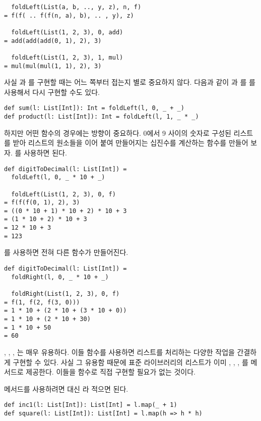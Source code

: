 \begin{verbatim}
  foldLeft(List(a, b, .., y, z), n, f)
= f(f( .. f(f(n, a), b), .. , y), z)

  foldLeft(List(1, 2, 3), 0, add)
= add(add(add(0, 1), 2), 3)

  foldLeft(List(1, 2, 3), 1, mul)
= mul(mul(mul(1, 1), 2), 3)
\end{verbatim}

사실 과 를 구현할 때는 어느 쪽부터 접는지 별로 중요하지
않다. 다음과 같이 과 를 를 사용해서 다시
구현할 수도 있다.

\begin{verbatim}
def sum(l: List[Int]): Int = foldLeft(l, 0, _ + _)
def product(l: List[Int]): Int = foldLeft(l, 1, _ * _)
\end{verbatim}

하지만 어떤 함수의 경우에는 방향이 중요하다. 0에서 9 사이의 숫자로 구성된
리스트를 받아 리스트의 원소들을 이어 붙여 만들어지는 십진수를 계산하는 함수를
만들어 보자. 를 사용하면 된다.

\begin{verbatim}
def digitToDecimal(l: List[Int]) =
  foldLeft(l, 0, _ * 10 + _)

  foldLeft(List(1, 2, 3), 0, f)
= f(f(f(0, 1), 2), 3)
= ((0 * 10 + 1) * 10 + 2) * 10 + 3
= (1 * 10 + 2) * 10 + 3
= 12 * 10 + 3
= 123
\end{verbatim}

를 사용하면 전혀 다른 함수가 만들어진다.

\begin{verbatim}
def digitToDecimal(l: List[Int]) =
  foldRight(l, 0, _ * 10 + _)

  foldRight(List(1, 2, 3), 0, f)
= f(1, f(2, f(3, 0)))
= 1 * 10 + (2 * 10 + (3 * 10 + 0))
= 1 * 10 + (2 * 10 + 30)
= 1 * 10 + 50
= 60
\end{verbatim}

, , , 는 매우 유용하다.
이들 함수를 사용하면 리스트를 처리하는 다양한 작업을 간결하게 구현할 수 있다.
사실 그 유용함 때문에 표준 라이브러리의 리스트가 이미 , ,
, 를 메서드로 제공한다. 이들을 함수로 직접 구현할
필요가 없는 것이다.

 메서드를 사용하려면  대신 라 적으면 된다.

\begin{verbatim}
def inc1(l: List[Int]): List[Int] = l.map(_ + 1)
def square(l: List[Int]): List[Int] = l.map(h => h * h)
\end{verbatim}

